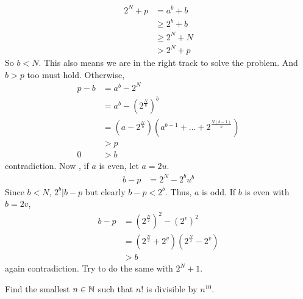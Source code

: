 \documentclass[problems.tex]{subfile}
\begin{document}
\begin{solution}
			\begin{align*}
				2^N+p & = a^b+b\\
					  &\geq2^b+b\\
					  &\geq2^N+N\\
					  & > 2^N+p
			\end{align*}
		So $b<N$. This also means we are in the right track to solve the problem. And $b>p$ too must hold. Otherwise,
			\begin{align*}
				p-b & = a^b-2^N\\
					& = a^b-\left(2^{\frac{N}{b}}\right)^b\\
					& = \left(a-2^{\frac{N}{b}}\right)\left(a^{b-1}+\ldots+2^{\frac{N(b-1)}{b}}\right)\\
					& > p\\
				0	& > b
			\end{align*}
		contradiction.  Now , if $a$ is even, let $a=2u$.
			\begin{align*}
				b-p & = 2^N-2^bu^b
			\end{align*}
		Since $b<N$, $2^b|b-p$ but clearly $b-p<2^b$. Thus, $a$ is odd. If $b$ is even with $b=2v$,
			\begin{align*}
				b-p & = \left(2^{\frac{N}{2}}\right)^2-\left(2^v\right)^2\\
					& = \left(2^{\frac{N}{2}}+2^v\right)\left(2^{\frac{N}{2}}-2^v\right)\\
					& > b
			\end{align*}
		again contradiction. Try to do the same with $2^N+1$.
	\end{solution}
	
	\begin{problem}[Columbia $2010$]
		Find the smallest $n\in\mathbb{N}$ such that $n!$ is divisible by $n^{10}$.
	\end{problem}
	
\end{document}
